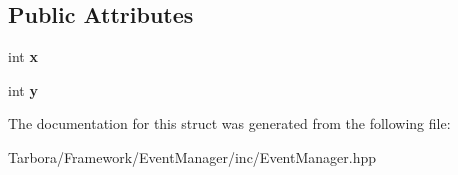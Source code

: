 \subsection*{Public Attributes}
\begin{DoxyCompactItemize}
\item 
\mbox{\label{structTarbora_1_1MouseMoveEvent_a695e7a628ce7e2c0239d61be637041ee}} 
int {\bfseries x}
\item 
\mbox{\label{structTarbora_1_1MouseMoveEvent_af780b66b826a499397e1766ab6f2a97d}} 
int {\bfseries y}
\end{DoxyCompactItemize}


The documentation for this struct was generated from the following file\+:\begin{DoxyCompactItemize}
\item 
Tarbora/\+Framework/\+Event\+Manager/inc/Event\+Manager.\+hpp\end{DoxyCompactItemize}
